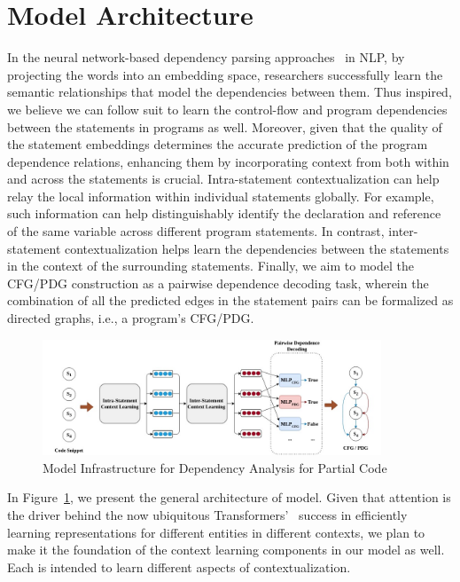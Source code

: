 \section{Model Architecture}
\label{sec:arch}

In the neural network-based dependency parsing
approaches~\cite{chen-manning-2014-fast} in NLP, by projecting the
words into an embedding space, researchers successfully learn the
semantic relationships that model the dependencies between them. Thus
inspired, we believe we can follow suit to learn the control-flow and
program dependencies between the statements in programs as
well. Moreover, given that the quality of the statement embeddings
determines the accurate prediction of the program dependence
relations, enhancing them by incorporating context from both within
and across the statements is crucial. Intra-statement
contextualization can help relay the local information within
individual statements globally. For example, such information can help
distinguishably identify the declaration and reference of the same
variable across different program statements. In contrast,
inter-statement contextualization helps learn the dependencies between
the statements in the context of the surrounding statements. Finally,
we aim to model the CFG/PDG construction as a pairwise dependence
decoding task, wherein the combination of all the predicted edges in
the statement pairs can be formalized as directed graphs, i.e., a
program's CFG/PDG.

\begin{figure}[ht]
\begin{center}
    \includegraphics[width=0.9\textwidth]{model-abstract.jpg}
    \caption{\tool Model Infrastructure for Dependency Analysis for Partial Code}
    \label{fig:model}
    \vspace{-10pt}
\end{center}
\end{figure}

In Figure~\ref{fig:model}, we present the general architecture of
\tool model. Given that attention is the driver behind the now
ubiquitous Transformers’~\cite{Vaswani-2017} success in efficiently
learning representations for different entities in different contexts,
we plan to make it the foundation of the context learning components
in our model as well. Each is intended to learn different aspects of
contextualization.

